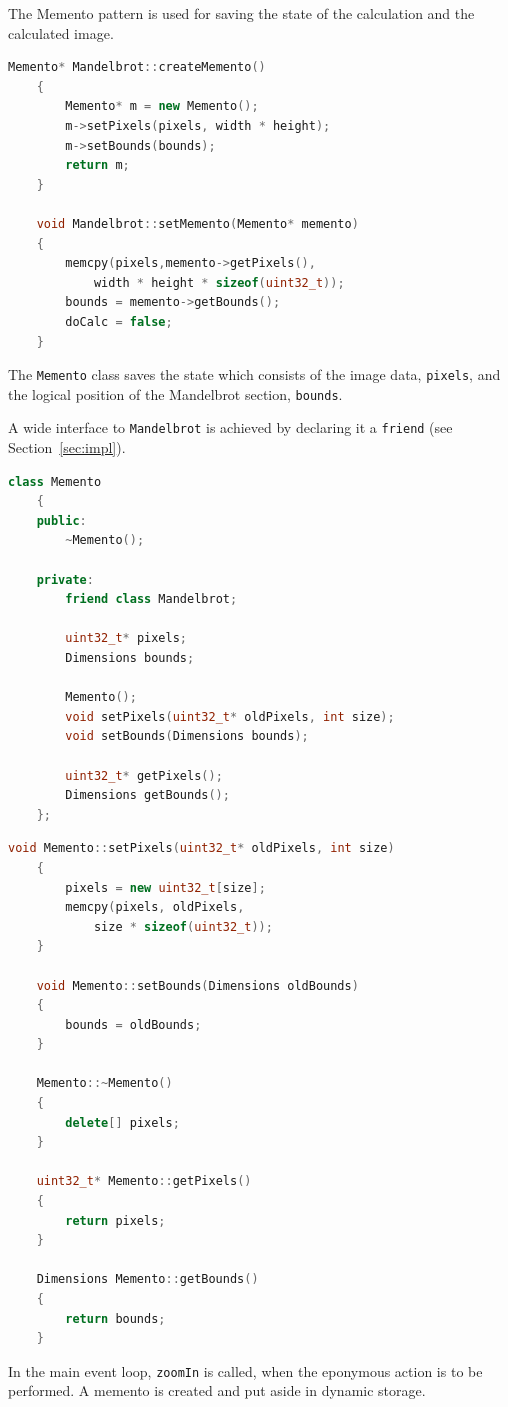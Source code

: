 \documentclass[11pt, a4paper, twoside]{article}
\begin{document}
	The Memento pattern is used for saving the state of the calculation and the calculated image.
	
	\begin{lstlisting}[language=c++, caption={Mandelbrot.cpp}]
	Memento* Mandelbrot::createMemento()
	{
		Memento* m = new Memento();
		m->setPixels(pixels, width * height);
		m->setBounds(bounds);
		return m;
	}
	
	void Mandelbrot::setMemento(Memento* memento)
	{
		memcpy(pixels,memento->getPixels(),
			width * height * sizeof(uint32_t));
		bounds = memento->getBounds();
		doCalc = false;
	}
	\end{lstlisting}
	
	The \verb|Memento| class saves the state which consists of the image data, \verb|pixels|, and the logical position of the Mandelbrot section, \verb|bounds|.
	
	A wide interface to \verb|Mandelbrot| is achieved by declaring it a \verb|friend| (see Section~\ref{sec:impl}).
	
	\begin{lstlisting}[language=c++, caption={Memento.h}]
	class Memento
	{
	public:
		~Memento();
		
	private:
		friend class Mandelbrot;
		
		uint32_t* pixels;
		Dimensions bounds;
		
		Memento();
		void setPixels(uint32_t* oldPixels, int size);
		void setBounds(Dimensions bounds);
		
		uint32_t* getPixels();
		Dimensions getBounds();
	};
	\end{lstlisting}
	
	\begin{lstlisting}[language=c++, caption={Memento.cpp}]
	void Memento::setPixels(uint32_t* oldPixels, int size)
	{
		pixels = new uint32_t[size];
		memcpy(pixels, oldPixels,
			size * sizeof(uint32_t));
	}
	
	void Memento::setBounds(Dimensions oldBounds)
	{
		bounds = oldBounds;
	}
	
	Memento::~Memento()
	{
		delete[] pixels;
	}
	
	uint32_t* Memento::getPixels()
	{
		return pixels;
	}
	
	Dimensions Memento::getBounds()
	{
		return bounds;
	}
	\end{lstlisting}
	
	In the main event loop, \verb|zoomIn| is called, when the eponymous action is to be performed. A memento is created and put aside in dynamic storage.
	
\end{document}
